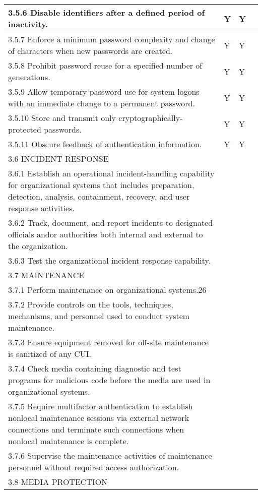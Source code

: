 \begin{longtable} {|p{}|p{}|p{}|p{} |}
{3.5.6 Disable identifiers after a defined period of inactivity.}&{Y}&{Y}& \\ \hline
{3.5.7 Enforce a minimum password complexity and change of characters when new passwords are created.}&{Y}&{Y}& \\ \hline
{3.5.8 Prohibit password reuse for a specified number of generations.}&{Y}&{Y}& \\ \hline
{3.5.9 Allow temporary password use for system logons with an immediate change to a permanent password.}&{Y}&{Y}& \\ \hline
{3.5.10 Store and transmit only cryptographically-protected passwords.}&{Y}&{Y}& \\ \hline
{3.5.11 Obscure feedback of authentication information.}&{Y}&{Y}& \\ \hline
{3.6 INCIDENT RESPONSE}&&& \\ \hline
{3.6.1 Establish an operational incident-handling capability for organizational systems that includes preparation, detection, analysis, containment, recovery, and user response activities.}&&& \\ \hline
{3.6.2 Track, document, and report incidents to designated officials and\/or authorities both internal and external to the organization.}&&& \\ \hline
{3.6.3 Test the organizational incident response capability.}&&& \\ \hline
{3.7 MAINTENANCE}&&& \\ \hline
{3.7.1 Perform maintenance on organizational systems.26}&&& \\ \hline
{3.7.2 Provide controls on the tools, techniques, mechanisms, and personnel used to conduct system maintenance.}&&& \\ \hline
{3.7.3 Ensure equipment removed for off-site maintenance is sanitized of any CUI.}&&& \\ \hline
{3.7.4 Check media containing diagnostic and test programs for malicious code before the media are used in organizational systems.}&&& \\ \hline
{3.7.5 Require multifactor authentication to establish nonlocal maintenance sessions via external network connections and terminate such connections when nonlocal maintenance is complete.}&&& \\ \hline
{3.7.6 Supervise the maintenance activities of maintenance personnel without required access authorization.}&&& \\ \hline
{3.8 MEDIA PROTECTION}&&& \\ \hline

\end{longtable}
